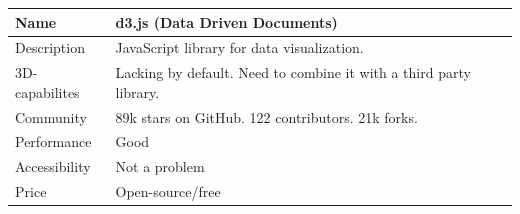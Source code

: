 \begin{longtable}[]{@{}ll@{}}
\toprule
\begin{minipage}[b]{0.32\columnwidth}\raggedright
Name\strut
\end{minipage} & \begin{minipage}[b]{0.62\columnwidth}\raggedright
d3.js (Data Driven Documents)\strut
\end{minipage}\tabularnewline
\midrule
\endhead
\begin{minipage}[t]{0.32\columnwidth}\raggedright
Description\strut
\end{minipage} & \begin{minipage}[t]{0.62\columnwidth}\raggedright
JavaScript library for data visualization.\strut
\end{minipage}\tabularnewline
\begin{minipage}[t]{0.32\columnwidth}\raggedright
3D-capabilites\strut
\end{minipage} & \begin{minipage}[t]{0.62\columnwidth}\raggedright
Lacking by default. Need to combine it with a third party library.\strut
\end{minipage}\tabularnewline
\begin{minipage}[t]{0.32\columnwidth}\raggedright
Community\strut
\end{minipage} & \begin{minipage}[t]{0.62\columnwidth}\raggedright
89k stars on GitHub. 122 contributors. 21k forks.\strut
\end{minipage}\tabularnewline
\begin{minipage}[t]{0.32\columnwidth}\raggedright
Performance\strut
\end{minipage} & \begin{minipage}[t]{0.62\columnwidth}\raggedright
Good\strut
\end{minipage}\tabularnewline
\begin{minipage}[t]{0.32\columnwidth}\raggedright
Accessibility\strut
\end{minipage} & \begin{minipage}[t]{0.62\columnwidth}\raggedright
Not a problem\strut
\end{minipage}\tabularnewline
\begin{minipage}[t]{0.32\columnwidth}\raggedright
Price\strut
\end{minipage} & \begin{minipage}[t]{0.62\columnwidth}\raggedright
Open-source/free\strut
\end{minipage}\tabularnewline
\bottomrule
\end{longtable}

